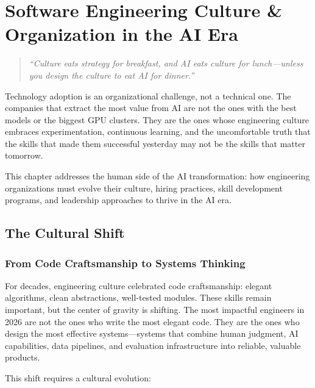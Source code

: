 \chapter{Software Engineering Culture \& Organization in the AI Era}
\label{ch:culture-org}

\begin{quote}
\itshape
``Culture eats strategy for breakfast, and AI eats culture for lunch---unless you design the culture to eat AI for dinner.''
\end{quote}

\vspace{0.5cm}

\noindent
Technology adoption is an organizational challenge, not a technical one. The companies that extract the most value from AI are not the ones with the best models or the biggest GPU clusters. They are the ones whose engineering culture embraces experimentation, continuous learning, and the uncomfortable truth that the skills that made them successful yesterday may not be the skills that matter tomorrow.

This chapter addresses the human side of the AI transformation: how engineering organizations must evolve their culture, hiring practices, skill development programs, and leadership approaches to thrive in the AI era.


\section{The Cultural Shift}

\subsection{From Code Craftsmanship to Systems Thinking}

For decades, engineering culture celebrated code craftsmanship: elegant algorithms, clean abstractions, well-tested modules. These skills remain important, but the center of gravity is shifting. The most impactful engineers in 2026 are not the ones who write the most elegant code. They are the ones who design the most effective systems---systems that combine human judgment, AI capabilities, data pipelines, and evaluation infrastructure into reliable, valuable products.

This shift requires a cultural evolution:

